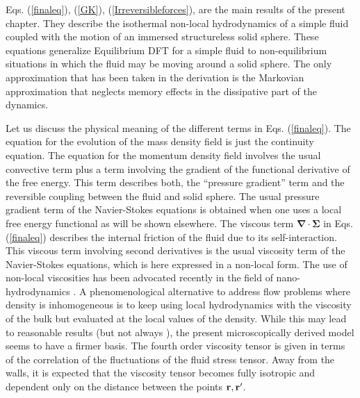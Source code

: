 \documentclass[b5paper,openright,11pt]{book}
\newcommand{\esc}{\!\cdot\!}
\newcommand{\Pendiente}[1]{{\color{green}#1}} %
\begin{document}
Eqs.   (\ref{finaleq}), (\ref{GK}),   (\ref{Irreversibleforces}), 
are the  main results of the present  chapter.  They describe
the isothermal non-local  hydrodynamics of a  simple fluid coupled with
the motion of an immersed structureless solid sphere.  These equations
generalize Equilibrium DFT for a simple fluid to
non-equilibrium situations in  which the fluid may be  moving around a
solid  sphere.  The  only approximation  that  has been  taken in  the
derivation is the Markovian approximation that neglects memory effects
in the dissipative part of the dynamics.

Let  us  discuss  the  physical  meaning of  the  different  terms  in
Eqs.  (\ref{finaleq}).  The  equation for  the evolution  of the  mass
density field is  just the continuity equation.  The  equation for the
momentum density field involves the  usual convective term plus a term
involving  the  gradient of  the  functional  derivative of  the  free
energy.  This term describes both,  the ``pressure gradient'' term and
the reversible coupling between the  fluid and solid sphere. The usual
pressure gradient term of the Navier-Stokes equations is obtained when
one  uses   a  local   free  energy  functional   as  will   be  shown
elsewhere.               The                viscous               term
$\boldsymbol{\nabla}\esc\boldsymbol{\Sigma}$  in Eqs.  (\ref{finaleq})
describes   the  internal   friction   of  the   fluid   due  to   its
self-interaction.  \Pendiente{This  viscous term involving second  derivatives is
the usual viscosity term of the Navier-Stokes equations, which is here
expressed in a  non-local form.  The use of  non-local viscosities has
been   advocated  recently   in   the   field  of   nano-hydrodynamics
\cite{Zhang2004a,Hansen2007,Todd2008a,Hansen2011}.  A phenomenological
alternative to address flow problems where density is inhomogeneous is
to keep using  local hydrodynamics with the viscosity of  the bulk but
evaluated at the local values of the density\cite{Bitsanis1987}. While
this   may    lead   to    reasonable   results   (but    not   always
\cite{Bitsanis1990}), the present  microscopically derived model seems
to have a firmer basis. The  fourth order viscosity tensor is given in
terms  of the  correlation of  the  fluctuations of  the fluid  stress
tensor.  Away from the walls, it is expected that the viscosity tensor
becomes fully isotropic and dependent only on the distance between the
points ${\bf r},{\bf r}'$.}
\end{document}
